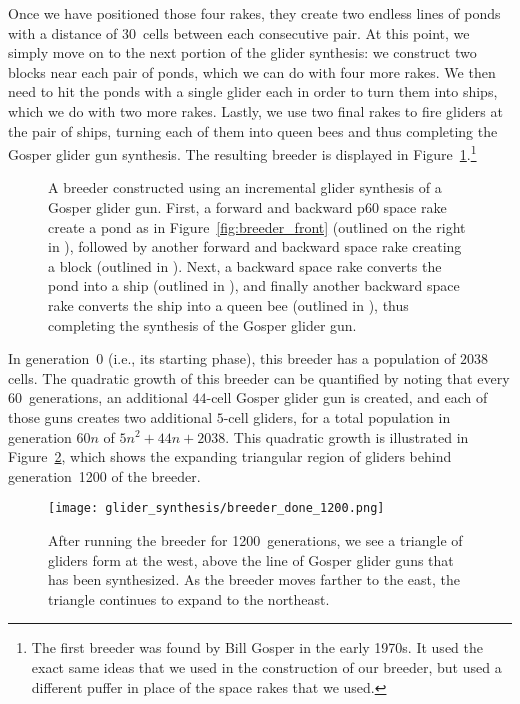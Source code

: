 Once we have positioned those four rakes, they create two endless lines of ponds with a distance of 30~cells between each consecutive pair. At this point, we simply move on to the next portion of the glider synthesis: we construct two blocks near each pair of ponds, which we can do with four more rakes. We then need to hit the ponds with a single glider each in order to turn them into ships, which we do with two more rakes. Lastly, we use two final rakes to fire gliders at the pair of ships, turning each of them into queen bees and thus completing the Gosper glider gun synthesis. The resulting breeder is displayed in Figure~\ref{fig:breeder_done}.\footnote{The first breeder was found by Bill Gosper in the early 1970s. It used the exact same ideas that we used in the construction of our breeder, but used a different puffer in place of the space rakes that we used.}

\begin{figure}[!ht]
	\centering
	\caption{A breeder constructed using an incremental glider synthesis of a Gosper glider gun. First, a forward and backward p60 space rake create a pond as in Figure~\ref{fig:breeder_front} (outlined on the right in ), followed by another forward and backward space rake creating a block (outlined in ). Next, a backward space rake converts the pond into a ship (outlined in ), and finally another backward space rake converts the ship into a queen bee (outlined in ), thus completing the synthesis of the Gosper glider gun.}\label{fig:breeder_done}
\end{figure}

In generation~0 (i.e., its starting phase), this breeder has a population of $2038$ cells. The quadratic growth of this breeder can be quantified by noting that every 60~generations, an additional $44$-cell Gosper glider gun is created, and each of those guns creates two additional $5$-cell gliders, for a total population in generation $60n$ of $5n^2 + 44n + 2038$. This quadratic growth is illustrated in Figure~\ref{fig:breeder_done_1200}, which shows the expanding triangular region of gliders behind generation~1200 of the breeder.

\begin{figure}[!htb]
	\centering\texttt{[image: glider\_synthesis/breeder\_done\_1200.png]}
	\caption{After running the breeder for 1200~generations, we see a triangle of gliders form at the west, above the line of Gosper glider guns that has been synthesized. As the breeder moves farther to the east, the triangle continues to expand to the northeast.}\label{fig:breeder_done_1200}
\end{figure}

